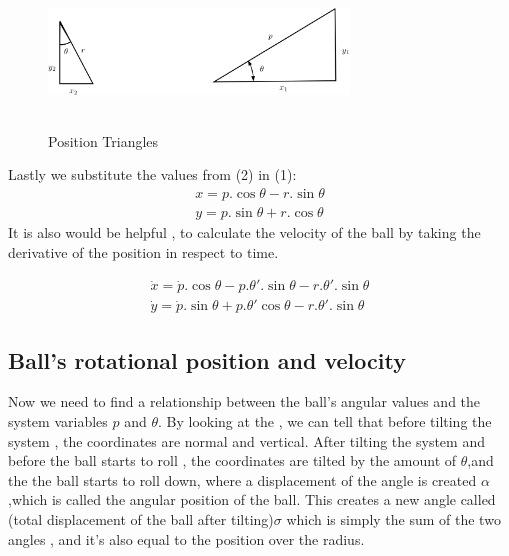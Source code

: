 \documentclass{article}
\begin{document}
\begin{figure}[h]
	\centering
	\includegraphics[height =4cm,width =8cm]{Triangles_System_Geo}
	\caption{Position Triangles}\label{SystemGeometry_Triangles}
\end{figure}
Lastly we substitute the values from (2) in (1):
\begin{equation}
	\begin{split}
		x = p.\cos{\theta} - r.\sin{\theta}\\
		y = p.\sin{\theta} + r.\cos{\theta}
	\end{split}
\end{equation}
It is also would be helpful , to calculate the velocity of the ball by taking the derivative of the position in respect to time.

\begin{equation}
	\begin{split}
		\dot{x}  = \dot{p}.\cos{\theta}-p.\theta'.\sin{\theta} - r.\theta'.\sin{\theta} \\
		\dot{y}  = \dot{p}.\sin{\theta}+ p.\theta'\cos{\theta} - r.\theta'.\sin{\theta} 
	\end{split}
\end{equation}
\newpage
\subsection{Ball's rotational position and velocity}
Now we need to find a relationship between the ball's angular values and the system variables $p$ and $\theta$.
By looking at the  , we can tell that before tilting the system , the coordinates are normal and vertical.
After tilting the system and before the ball starts to roll , the coordinates are tilted by the amount of $\theta$,and the the ball starts to roll down, where 
a displacement of the angle is created $\alpha$,which is called the angular position of the ball.
This creates a new angle called (total displacement of the ball after tilting)$\sigma$ which is simply the sum of the two angles , and it's also equal to the position over the radius.
\end{document}
